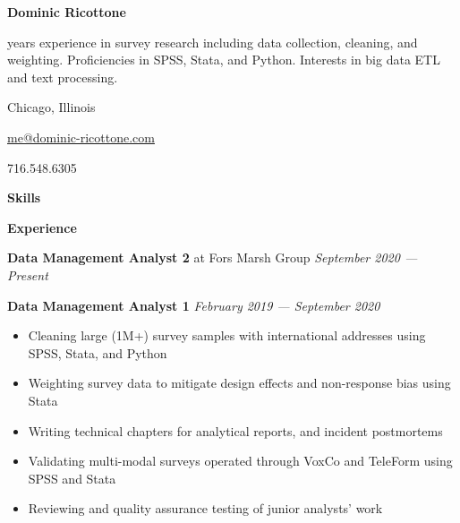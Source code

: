 \documentclass[12pt]{article}
\begin{document}
\begin{vwcol}[widths={0.65,0.35},justify=flush,rule=0pt]
\Huge
\noindent \textbf{Dominic Ricottone}
\normalsize

\vspace{.5em}
 years experience in survey research including data collection, cleaning, and weighting.
Proficiencies in SPSS, Stata, and Python.
Interests in big data ETL and text processing.

\noindent {} Chicago, Illinois

\vspace{.5em}
\noindent {} \href{mailto:me@dominic-ricottone.com}{me@dominic-ricottone.com}

\vspace{.5em}
\noindent {} 716.548.6305
\end{vwcol}

\vspace{.5em}
\large
\noindent \textbf{Skills} \hrulefill
\normalsize

\vspace{.5em}
{}

{}
\tcbox{\strut \LaTeX}
\vspace{1em}

\large
\noindent \textbf{Experience} \hrulefill
\normalsize
\vspace{.5em}

\noindent \textbf{Data Management Analyst 2} at Fors Marsh Group \hfill \textit{September 2020 --- Present}
\vspace{.5em}

\noindent \textbf{Data Management Analyst 1} \hfill \textit{February 2019 --- September 2020}
\begin{itemize}[]
\item Cleaning large (1M+) survey samples with international addresses using SPSS, Stata, and Python
\item Weighting survey data to mitigate design effects and non-response bias using Stata
\item Writing technical chapters for analytical reports, and incident postmortems
\item Validating multi-modal surveys operated through VoxCo and TeleForm using SPSS and Stata
\item Reviewing and quality assurance testing of junior analysts' work
\end{itemize}
\end{document}
